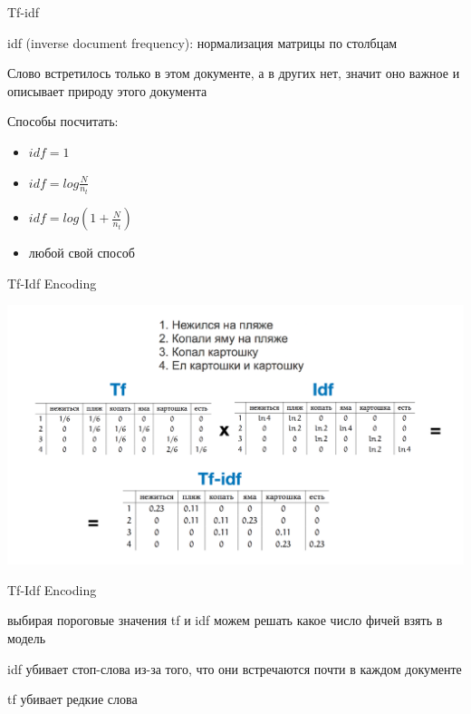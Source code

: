 \documentclass[notes,12pt, aspectratio=169]{beamer}
\newenvironment{wideitemize}{\itemize\addtolength{\itemsep}{10pt}}{\enditemize}
\begin{document}
\begin{frame}{Tf-idf}
	\begin{wideitemize} 
		\item  \alert{idf (inverse document frequency):} нормализация матрицы по столбцам
		
		\item Слово встретилось только в этом документе, а в других нет, значит оно важное и описывает природу этого документа
		
		\item  Способы посчитать: 
		\begin{itemize}
			\item  $idf = 1$
			
			\item  $idf = log  \frac{N}{n_t}$
			
			\item  $idf = log \left(1 +  \frac{N}{n_t} \right)$
			
			\item  любой свой способ
		\end{itemize}
	\end{wideitemize}
\end{frame} 


\begin{frame}{Tf-Idf Encoding}
	\begin{center}
		\includegraphics[width=.9\linewidth]{tf-idf.png}
	\end{center}
\end{frame} 


\begin{frame}{Tf-Idf Encoding}
	\begin{wideitemize} 
		\item  выбирая пороговые значения tf и idf можем решать какое число фичей взять в модель
		\item  idf убивает стоп-слова из-за того, что они встречаются почти в каждом документе
		\item  tf убивает редкие слова 
	\end{wideitemize}
\end{frame} 
\end{document}
